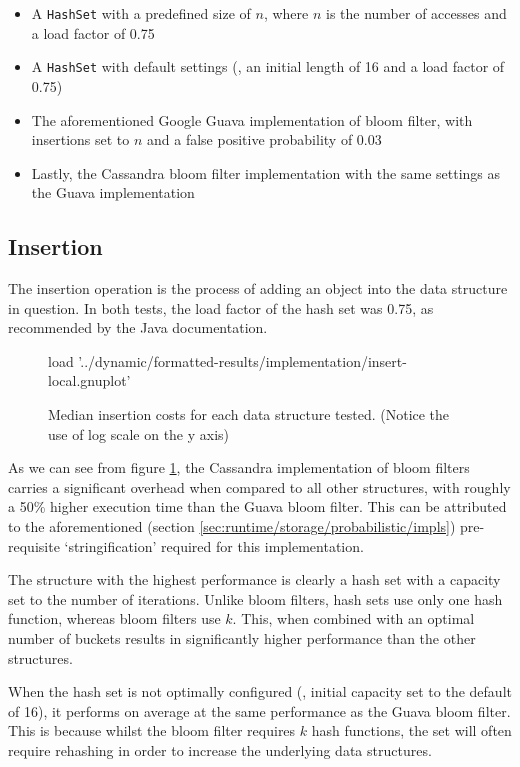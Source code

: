 \begin{itemize}
	\item A \texttt{HashSet} with a predefined size of $n$, where $n$ is the number of accesses and a load factor of 0.75
	\item A \texttt{HashSet} with default settings (\ie, an initial length of 16 and a load factor of 0.75)
	\item The aforementioned Google Guava implementation of bloom filter, with insertions set to $n$ and a false positive probability of 0.03
	\item Lastly, the Cassandra bloom filter implementation with the same settings as the Guava implementation
\end{itemize}

	\subsection{Insertion} \label{sec:results/bfimpl/insert}
	The insertion operation is the process of adding an object into the data structure in question. In both tests, the load factor of the hash set was 0.75, as recommended by the Java documentation.
	
	\begin{figure}
		\centering
		\begin{gnuplot}[terminal=pdf]
			load '../dynamic/formatted-results/implementation/insert-local.gnuplot'
		\end{gnuplot}
		\caption{Median insertion costs for each data structure tested. (Notice the use of log scale on the y axis)}
		\label{chart:impl-insert}
	\end{figure}
	
	As we can see from figure \ref{chart:impl-insert}, the Cassandra implementation of bloom filters carries a significant overhead when compared to all other structures, with roughly a 50\% higher execution time than the Guava bloom filter. This can be attributed to the aforementioned (section \ref{sec:runtime/storage/probabilistic/impls}) pre-requisite `stringification' required for this implementation.
	
	The structure with the highest performance is clearly a hash set with a capacity set to the number of iterations. Unlike bloom filters, hash sets use only one hash function, whereas bloom filters use $k$. This, when combined with an optimal number of buckets results in significantly higher performance than the other structures.
	
	When the hash set is not optimally configured (\ie, initial capacity set to the default of 16), it performs on average at the same performance as the Guava bloom filter. This is because whilst the bloom filter requires $k$ hash functions, the set will often require rehashing in order to increase the underlying data structures.
	
